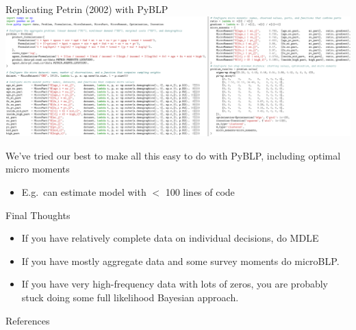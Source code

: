 \begin{frame}{Replicating Petrin (2002) with PyBLP}
    \vspace{0.5em}
    \includegraphics[width=\textwidth]{resources/petrin.png}
    \begin{wideitemize}
        \item We've tried our best to make all this easy to do with \alert{PyBLP}, including optimal micro moments
        \begin{itemize}
            \item E.g.\ can estimate  model with $<$ 100 lines of code
        \end{itemize}
    \end{wideitemize}
\end{frame}


\begin{frame}{Final Thoughts}
\begin{itemize}
    \item If you have relatively complete data on individual decisions, do MDLE
    \item If you have mostly aggregate data and some survey moments do microBLP.
    \item If you have very high-frequency data with lots of zeros, you are probably stuck doing some full likelihood Bayesian approach.
\end{itemize}
\end{frame}

\appendix

\begin{frame}{References}
    
\end{frame}
